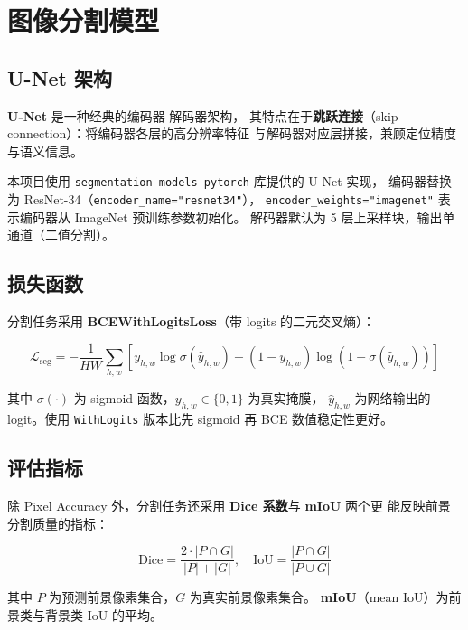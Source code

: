 \documentclass[12pt, a4paper, openany]{ctexbook}
\begin{document}
\section{图像分割模型}

\subsection{U-Net 架构}

\textbf{U-Net}\cite{ronneberger2015unet} 是一种经典的编码器-解码器架构，
其特点在于\textbf{跳跃连接}（skip connection）：将编码器各层的高分辨率特征
与解码器对应层拼接，兼顾定位精度与语义信息。

本项目使用 \texttt{segmentation-models-pytorch} 库提供的 U-Net 实现，
编码器替换为 ResNet-34（\texttt{encoder\_name="resnet34"}），
\texttt{encoder\_weights="imagenet"} 表示编码器从 ImageNet 预训练参数初始化。
解码器默认为 5 层上采样块，输出单通道（二值分割）。

\subsection{损失函数}

分割任务采用 \textbf{BCEWithLogitsLoss}（带 logits 的二元交叉熵）：

\begin{equation}
  \mathcal{L}_{\text{seg}} = -\frac{1}{HW}\sum_{h,w}
    \left[
      y_{h,w} \log \sigma(\hat{y}_{h,w}) +
      (1 - y_{h,w}) \log (1 - \sigma(\hat{y}_{h,w}))
    \right]
\end{equation}

其中 $\sigma(\cdot)$ 为 sigmoid 函数，$y_{h,w} \in \{0, 1\}$ 为真实掩膜，
$\hat{y}_{h,w}$ 为网络输出的 logit。使用 \texttt{WithLogits} 版本比先 sigmoid
再 BCE 数值稳定性更好。

\subsection{评估指标}

除 Pixel Accuracy 外，分割任务还采用 \textbf{Dice 系数}与 \textbf{mIoU} 两个更
能反映前景分割质量的指标：

\begin{equation}
  \text{Dice} = \frac{2 \cdot |P \cap G|}{|P| + |G|},\quad
  \text{IoU}  = \frac{|P \cap G|}{|P \cup G|}
\end{equation}

其中 $P$ 为预测前景像素集合，$G$ 为真实前景像素集合。
\textbf{mIoU}（mean IoU）为前景类与背景类 IoU 的平均。
\end{document}
